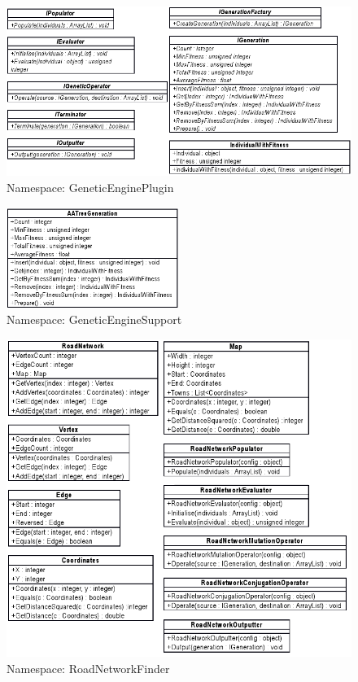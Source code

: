 \begin{figure}[ht!]
 \caption{Namespace: GeneticEnginePlugin}
 \centering
 \includegraphics[width=\textwidth]{../GeneticEnginePluginDetail.png}
\end{figure}

\begin{figure}[ht!]
 \caption{Namespace: GeneticEngineSupport}
 \centering
 \includegraphics[width=0.5\textwidth]{../GeneticEngineSupportDetail.png}
\end{figure}

\begin{figure}[ht!]
 \caption{Namespace: RoadNetworkFinder}
 \centering
 \includegraphics[width=\textwidth]{../RoadNetworkFinderDetail.png}
\end{figure}

